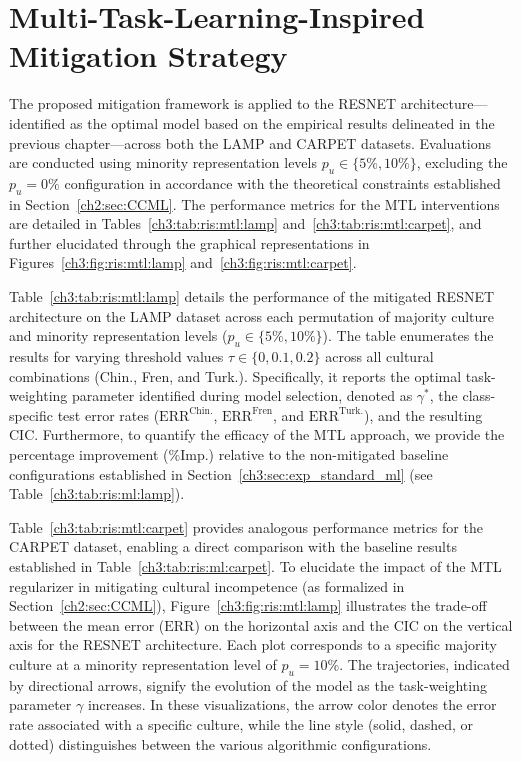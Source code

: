 \section{Multi-Task-Learning-Inspired Mitigation Strategy}
\label{sec:exp_mitigation:res}
The proposed mitigation framework is applied to the RESNET architecture—identified as the optimal model based on the empirical results delineated in the previous chapter—across both the LAMP and CARPET datasets. 
Evaluations are conducted using minority representation levels $p_u \in \{5\%, 10\%\}$, excluding the $p_u = 0\%$ configuration in accordance with the theoretical constraints established in Section~\ref{ch2:sec:CCML}.
The performance metrics for the MTL interventions are detailed in Tables~\ref{ch3:tab:ris:mtl:lamp} and~\ref{ch3:tab:ris:mtl:carpet}, and further elucidated through the graphical representations in Figures~\ref{ch3:fig:ris:mtl:lamp} and~\ref{ch3:fig:ris:mtl:carpet}.

Table~\ref{ch3:tab:ris:mtl:lamp} details the performance of the mitigated RESNET architecture on the LAMP dataset across each permutation of majority culture and minority representation levels ($p_u \in \{5\%, 10\%\}$). 
The table enumerates the results for varying threshold values $\tau \in \{0, 0.1, 0.2\}$ across all cultural combinations (Chin., Fren, and Turk.).
Specifically, it reports the optimal task-weighting parameter identified during model selection, denoted as $\gamma^*$, the class-specific test error rates ($\text{ERR}^{\text{Chin.}}$, $\text{ERR}^{\text{Fren}}$, and $\text{ERR}^{\text{Turk.}}$), and the resulting CIC. 
Furthermore, to quantify the efficacy of the MTL approach, we provide the percentage improvement ($\%\text{Imp.}$) relative to the non-mitigated baseline configurations established in Section~\ref{ch3:sec:exp_standard_ml} (see Table~\ref{ch3:tab:ris:ml:lamp}).

Table~\ref{ch3:tab:ris:mtl:carpet} provides analogous performance metrics for the CARPET dataset, enabling a direct comparison with the baseline results established in Table~\ref{ch3:tab:ris:ml:carpet}.
To elucidate the impact of the MTL regularizer in mitigating cultural incompetence (as formalized in Section~\ref{ch2:sec:CCML}), Figure~\ref{ch3:fig:ris:mtl:lamp} illustrates the trade-off between the mean error ($\text{ERR}$) on the horizontal axis and the CIC on the vertical axis for the RESNET architecture. 
Each plot corresponds to a specific majority culture at a minority representation level of $p_u=10\%$. 
The trajectories, indicated by directional arrows, signify the evolution of the model as the task-weighting parameter $\gamma$ increases. 
In these visualizations, the arrow color denotes the error rate associated with a specific culture, while the line style (solid, dashed, or dotted) distinguishes between the various algorithmic configurations.

